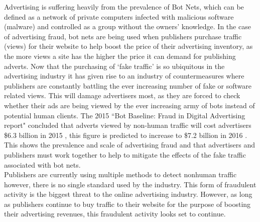 \documentclass[12pt]{article}
\begin{document}
Advertising is suffering heavily from the prevalence of Bot Nets, which can be defined as a network of private computers infected with malicious software (malware)  and controlled as a group without the owners' knowledge. In the case of advertising fraud, bot nets are being used when publishers purchase traffic (views) for their website to help boost the price of their advertising inventory, as the more views a site has the higher the price it can demand for publishing adverts. Now that the purchasing of `fake traffic' is so ubiquitous in the advertising industry it has given rise to an industry of countermeasures \parencite{bloomFraud} where publishers are constantly battling the ever increasing number of fake or software related views. This will damage advertisers most, as they are forced to check whether their ads are being viewed by the ever increasing army of bots instead of potential human clients. The 2015 ``Bot Baseline: Fraud in Digital Advertising report" concluded that adverts viewed by non-human traffic will cost advertisers \$6.3 billion in 2015 \parencite{botfraud2015}, this figure is predicted to increase to \$7.2 billion in 2016 \parencite{botfraud2016}. This shows the prevalence and scale of advertising fraud and that advertisers and publishers must work together to help to mitigate the effects of the fake traffic associated with bot nets. \\

Publishers are currently using multiple methods to detect nonhuman traffic however, there is no single standard used by the industry. This form of fraudulent activity is the biggest threat to the online advertising industry. However, as long as publishers continue to buy traffic to their website for the purpose of boosting their advertising revenues, this fraudulent activity looks set to continue.

\end{document}
